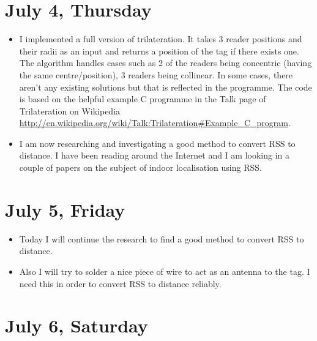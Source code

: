 \documentclass[a4paper,12pt]{article}
\begin{document}
\section{July 4, Thursday}

\begin{itemize}
	\item I implemented a full version of trilateration. It takes 3 reader positions and their radii as an input and returns a position of the tag if there exists one. The algorithm handles cases such as 2 of the readers being concentric (having the same centre/position), 3 readers being collinear. In some cases, there aren't any existing solutions but that is reflected in the programme. The code is based on the helpful example C programme in the Talk page of Trilateration on Wikipedia \url{http://en.wikipedia.org/wiki/Talk:Trilateration#Example_C_program}.
	\item I am now researching and investigating a good method to convert RSS to distance. I have been reading around the Internet and I am looking in a couple of papers on the subject of indoor localisation using RSS.
\end{itemize}

\section{July 5, Friday}

\begin{itemize}
	\item Today I will continue the research to find a good method to convert RSS to distance.
	\item Also I will try to solder a nice piece of wire to act as an antenna to the tag. I need this in order to convert RSS to distance reliably.
\end{itemize}

\section{July 6, Saturday}
\end{document}

